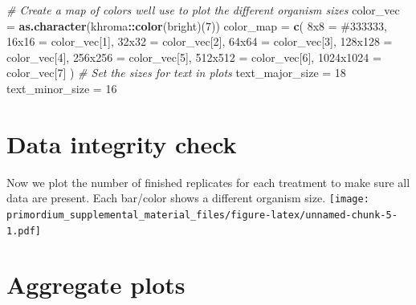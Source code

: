 \documentclass[
]{book}
\newenvironment{Shaded}{\begin{snugshade}}{\end{snugshade}}
\newcommand{\CommentTok}[1]{\textcolor[rgb]{0.56,0.35,0.01}{\textit{#1}}}
\newcommand{\DecValTok}[1]{\textcolor[rgb]{0.00,0.00,0.81}{#1}}
\newcommand{\KeywordTok}[1]{\textcolor[rgb]{0.13,0.29,0.53}{\textbf{#1}}}
\newcommand{\NormalTok}[1]{#1}
\newcommand{\OperatorTok}[1]{\textcolor[rgb]{0.81,0.36,0.00}{\textbf{#1}}}
\newcommand{\StringTok}[1]{\textcolor[rgb]{0.31,0.60,0.02}{#1}}
\begin{document}
\begin{Shaded}
\begin{Highlighting}[]
\CommentTok{\# Create a map of colors we\textquotesingle{}ll use to plot the different organism sizes}
\NormalTok{color\_vec =}\StringTok{ }\KeywordTok{as.character}\NormalTok{(khroma}\OperatorTok{::}\KeywordTok{color}\NormalTok{(}\StringTok{\textquotesingle{}bright\textquotesingle{}}\NormalTok{)(}\DecValTok{7}\NormalTok{))}
\NormalTok{color\_map =}\StringTok{ }\KeywordTok{c}\NormalTok{(}
  \StringTok{\textquotesingle{}8x8\textquotesingle{}}\NormalTok{ =}\StringTok{       \textquotesingle{}\#333333\textquotesingle{}}\NormalTok{,}
  \StringTok{\textquotesingle{}16x16\textquotesingle{}}\NormalTok{ =}\StringTok{     }\NormalTok{color\_vec[}\DecValTok{1}\NormalTok{],}
  \StringTok{\textquotesingle{}32x32\textquotesingle{}}\NormalTok{ =}\StringTok{     }\NormalTok{color\_vec[}\DecValTok{2}\NormalTok{],}
  \StringTok{\textquotesingle{}64x64\textquotesingle{}}\NormalTok{ =}\StringTok{     }\NormalTok{color\_vec[}\DecValTok{3}\NormalTok{],}
  \StringTok{\textquotesingle{}128x128\textquotesingle{}}\NormalTok{ =}\StringTok{   }\NormalTok{color\_vec[}\DecValTok{4}\NormalTok{],}
  \StringTok{\textquotesingle{}256x256\textquotesingle{}}\NormalTok{ =}\StringTok{   }\NormalTok{color\_vec[}\DecValTok{5}\NormalTok{],}
  \StringTok{\textquotesingle{}512x512\textquotesingle{}}\NormalTok{ =}\StringTok{   }\NormalTok{color\_vec[}\DecValTok{6}\NormalTok{],}
  \StringTok{\textquotesingle{}1024x1024\textquotesingle{}}\NormalTok{ =}\StringTok{ }\NormalTok{color\_vec[}\DecValTok{7}\NormalTok{]}
\NormalTok{)}
\CommentTok{\# Set the sizes for text in plots}
\NormalTok{text\_major\_size =}\StringTok{ }\DecValTok{18}
\NormalTok{text\_minor\_size =}\StringTok{ }\DecValTok{16} 
\end{Highlighting}
\end{Shaded}

\hypertarget{data-integrity-check}{%
\section{Data integrity check}\label{data-integrity-check}}

Now we plot the number of finished replicates for each treatment to make sure all data are present.
Each bar/color shows a different organism size.
\texttt{[image: primordium\_supplemental\_material\_files/figure-latex/unnamed-chunk-5-1.pdf]}

\hypertarget{aggregate-plots}{%
\section{Aggregate plots}\label{aggregate-plots}}
\end{document}
